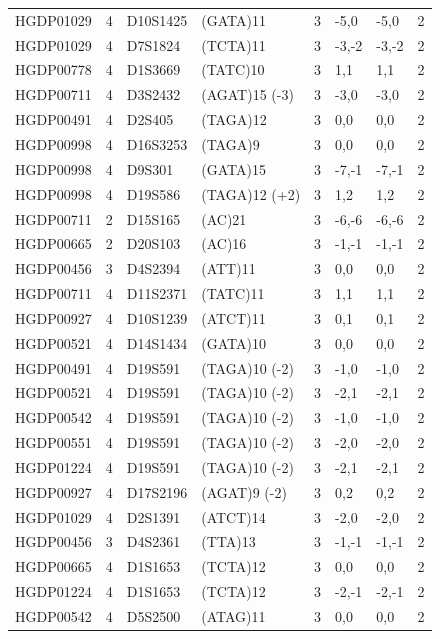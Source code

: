 \begin{table}[h!]
\begin{adjustbox}{width=1\textwidth,height=0.5\textwidth}
\begin{tabular}{l l l l l l l l  }
HGDP01029 & 4 & D10S1425 & (GATA)11 & 3 & -5,0  & -5,0  & 2   \\
HGDP01029 & 4 & D7S1824  & (TCTA)11 & 3 & -3,-2 & -3,-2 & 2   \\
HGDP00778 & 4 & D1S3669  & (TATC)10 & 3 & 1,1   & 1,1   & 2   \\
HGDP00711 & 4 & D3S2432  & (AGAT)15 (-3) & 3 & -3,0  & -3,0  & 2   \\
HGDP00491 & 4 & D2S405   & (TAGA)12 & 3 & 0,0   & 0,0   & 2   \\
HGDP00998 & 4 & D16S3253 & (TAGA)9  & 3 & 0,0   & 0,0   & 2   \\
HGDP00998 & 4 & D9S301   & (GATA)15 & 3 & -7,-1 & -7,-1 & 2   \\
HGDP00998 & 4 & D19S586  & (TAGA)12 (+2)& 3 & 1,2   & 1,2   & 2   \\
HGDP00711 & 2 & D15S165  & (AC)21   & 3 & -6,-6 & -6,-6 & 2   \\
HGDP00665 & 2 & D20S103  & (AC)16   & 3 & -1,-1 & -1,-1 & 2   \\
HGDP00456 & 3 & D4S2394  & (ATT)11  & 3 & 0,0   & 0,0   & 2   \\
HGDP00711 & 4 & D11S2371 & (TATC)11 & 3 & 1,1   & 1,1   & 2   \\
HGDP00927 & 4 & D10S1239 & (ATCT)11 & 3 & 0,1   & 0,1   & 2   \\
HGDP00521 & 4 & D14S1434 & (GATA)10 & 3 & 0,0   & 0,0   & 2   \\
HGDP00491 & 4 & D19S591  & (TAGA)10 (-2)& 3 & -1,0  & -1,0  & 2   \\
HGDP00521 & 4 & D19S591  & (TAGA)10 (-2)& 3 & -2,1  & -2,1  & 2   \\
HGDP00542 & 4 & D19S591  & (TAGA)10 (-2) & 3 & -1,0  & -1,0  & 2   \\
HGDP00551 & 4 & D19S591  & (TAGA)10 (-2) & 3 & -2,0  & -2,0  & 2   \\
HGDP01224 & 4 & D19S591  & (TAGA)10 (-2)& 3 & -2,1  & -2,1  & 2   \\
HGDP00927 & 4 & D17S2196 & (AGAT)9 (-2) & 3 & 0,2   & 0,2   & 2   \\
HGDP01029 & 4 & D2S1391  & (ATCT)14 & 3 & -2,0  & -2,0  & 2   \\
HGDP00456 & 3 & D4S2361  & (TTA)13  & 3 & -1,-1 & -1,-1 & 2   \\
HGDP00665 & 4 & D1S1653  & (TCTA)12 & 3 & 0,0   & 0,0   & 2   \\
HGDP01224 & 4 & D1S1653  & (TCTA)12 & 3 & -2,-1 & -2,-1 & 2   \\
HGDP00542 & 4 & D5S2500  & (ATAG)11 & 3 & 0,0   & 0,0   & 2   \\

\end{tabular}
\end{adjustbox}
\end{table}
